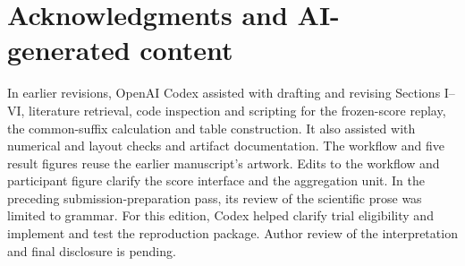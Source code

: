 \section*{Acknowledgments and AI-generated content}
In earlier revisions, OpenAI Codex assisted with drafting and revising Sections I--VI, literature retrieval, code inspection and scripting for the frozen-score replay, the common-suffix calculation and table construction. It also assisted with numerical and layout checks and artifact documentation. The workflow and five result figures reuse the earlier manuscript's artwork. Edits to the workflow and participant figure clarify the score interface and the aggregation unit. In the preceding submission-preparation pass, its review of the scientific prose was limited to grammar. For this edition, Codex helped clarify trial eligibility and implement and test the reproduction package. Author review of the interpretation and final disclosure is pending.
